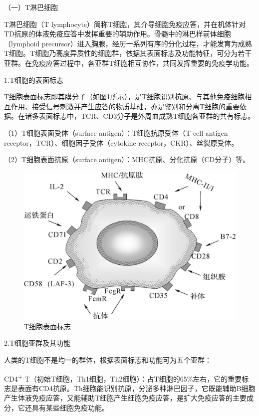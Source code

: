 （一）T淋巴细胞

T淋巴细胞（T
lymphocyte）简称T细胞，其介导细胞免疫应答，并在机体针对TD抗原的体液免疫应答中发挥重要的辅助作用。骨髓中的淋巴样前体细胞（lymphoid
precursor）进入胸腺，经历一系列有序的分化过程，才能发育为成熟T细胞。T细胞乃高度异质性的细胞群，依据其表面标志及功能特征，可分为若干亚群。在免疫应答过程中，各亚群T细胞相互协作，共同发挥重要的免疫学功能。

1.T细胞的表面标志

T细胞表面标志即其膜分子（如图\ref{fig2-14}所示），是T细胞识别抗原、与其他免疫细胞相互作用、接受信号刺激并产生应答的物质基础，亦是鉴别和分离T细胞的重要依据。在诸多表面标志中，TCR、CD3分子是外周血成熟T细胞各亚群的共有标志。

（1）T细胞表面受体（surface antigen）：T细胞抗原受体（T cell antigen
receptor，TCR）、细胞因子受体（cytokine receptor，CKR）、丝裂原受体。

（2）T细胞表面抗原（surface antigen）：MHC抗原、分化抗原（CD分子）等。

\begin{figure}[!htbp]
 \centering
 \includegraphics{./images/Image00039.jpg}
 \caption{T细胞表面标志}
 \label{fig2-14}
  \end{figure} 

2.T细胞亚群及其功能

人类的T细胞不是均一的群体，根据表面标志和功能可为五个亚群：

CD4\textsuperscript{+}
T（初始T细胞，Th1细胞，Th2细胞）：占T细胞的65\%左右，它的重要标志是表面有CD4抗原。Th细胞能识别抗原，分泌多种淋巴因子，它既能辅助B细胞产生体液免疫应答，又能辅助T细胞产生细胞免疫应答，是扩大免疫应答的主要成分，它还具有某些细胞免疫功能。

